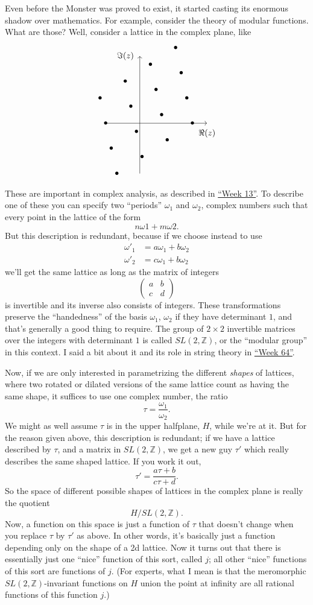 \documentclass{article}
\begin{document}
Even before the Monster was proved to exist, it started casting its
enormous shadow over mathematics. For example, consider the theory of
modular functions. What are those? Well, consider a lattice in the
complex plane, like \[
  \begin{tikzpicture}[scale=0.7]
    \draw[->] (-2,0) to (4,0) node[label=below:{$\Re(z)$}]{};
    \draw[->] (0,-3) to (0,4) node[label=left:{$\Im(z)$}]{};
    \foreach \m in {-1,0,1,2}
    {
      \foreach \n in {-1,0,1,2}
      {
        \node at ({\m*1.5-\n/3-0.2},{1.5*\n+\m-0.5}) {$\bullet$};
      }
    }
  \end{tikzpicture}
\] These are important in complex analysis, as described in
\protect\hyperlink{week13}{``Week 13''}. To describe one of these you
can specify two ``periods'' \(\omega_1\) and \(\omega_2\), complex
numbers such that every point in the lattice of the form
\[n \omega1 + m \omega2.\] But this description is redundant, because if
we choose instead to use \[
  \begin{aligned}
    \omega'_1 &= a\omega_1+b\omega_2
  \\\omega'_2 &= c\omega_1+b\omega_2
  \end{aligned}
\] we'll get the same lattice as long as the matrix of integers \[
  \left(
    \begin{array}{cc}
      a&b\\c&d
    \end{array}
  \right)
\] is invertible and its inverse also consists of integers. These
transformations preserve the ``handedness'' of the basis \(\omega_1\),
\(\omega_2\) if they have determinant \(1\), and that's generally a good
thing to require. The group of \(2\times2\) invertible matrices over the
integers with determinant \(1\) is called \(SL(2,\mathbb{Z})\), or the
``modular group'' in this context. I said a bit about it and its role in
string theory in \protect\hyperlink{week64}{``Week 64''}.

Now, if we are only interested in parametrizing the different
\emph{shapes} of lattices, where two rotated or dilated versions of the
same lattice count as having the same shape, it suffices to use one
complex number, the ratio \[\tau=\frac{\omega_1}{\omega_2}.\] We might
as well assume \(\tau\) is in the upper halfplane, \(H\), while we're at
it. But for the reason given above, this description is redundant; if we
have a lattice described by \(\tau\), and a matrix in
\(SL(2,\mathbb{Z})\), we get a new guy \(\tau'\) which really describes
the same shaped lattice. If you work it out,
\[\tau' = \frac{a\tau + b}{c\tau + d}.\] So the space of different
possible shapes of lattices in the complex plane is really the quotient
\[H/SL(2,\mathbb{Z}).\] Now, a function on this space is just a function
of \(\tau\) that doesn't change when you replace \(\tau\) by \(\tau'\)
as above. In other words, it's basically just a function depending only
on the shape of a 2d lattice. Now it turns out that there is essentially
just one ``nice'' function of this sort, called \(j\); all other
``nice'' functions of this sort are functions of \(j\). (For experts,
what I mean is that the meromorphic \(SL(2,\mathbb{Z})\)-invariant
functions on \(H\) union the point at infinity are all rational
functions of this function \(j\).)
\end{document}
